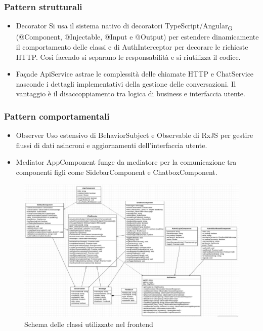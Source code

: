 \subsubsection*{Pattern strutturali}
\begin{itemize}
    \item Decorator
    \newline\newline Si usa il sistema nativo di decoratori TypeScript/Angular\textsubscript{G} (@Component, @Injectable, @Input e @Output) per estendere dinamicamente il comportamento delle classi e di AuthInterceptor per decorare le richieste HTTP. Così facendo si separano le responsabilità e si riutilizza il codice.
    \item Façade
    \newline\newline ApiService astrae le complessità delle chiamate HTTP e ChatService nasconde i dettagli implementativi della gestione delle conversazioni. Il vantaggio è il disaccoppiamento tra logica di business e interfaccia utente. 
\end{itemize}
\subsubsection*{Pattern comportamentali}
\begin{itemize}
    \item Observer
    \newline\newline Uso estensivo di BehaviorSubject e Observable di RxJS per gestire flussi di dati asincroni e aggiornamenti dell'interfaccia utente. 
    \item Mediator
    \newline\newline AppComponent funge da mediatore per la comunicazione tra componenti figli come SidebarComponent e ChatboxComponent. 
\end{itemize}


\begin{figure}[H]
    \centering
    \includegraphics[width=\textwidth]{images/FrontendUML.png}
    \caption{Schema delle classi utilizzate nel frontend}
    \label{fig:architettura}
\end{figure}

